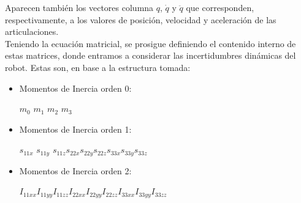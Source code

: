 Aparecen también los vectores columna $q$, $\dot{q}$ y $\ddot{q}$ que corresponden, respectivamente, a los valores de posición, velocidad y aceleración de las articulaciones.\\



Teniendo la ecuación matricial, se prosigue definiendo el contenido interno de estas matrices, donde entramos a considerar las incertidumbres dinámicas del robot. Estas son, en base a la estructura tomada:

\vspace{0.3cm}



\begin{itemize}
	
	\item Momentos de Inercia orden 0:
	
	\begin{center}
		
		$ m_0$ \hspace{0.2cm} $m_1$\hspace{0.2cm} $m_2$ \hspace{0.2cm}$m_3$
		
	\end{center}
	
	\item Momentos de Inercia orden 1:
	
	\begin{center}
		
		$ s_{11x}$\hspace{0.2cm} $s_{11y}$\hspace{0.2cm} $s_{11z}$\hspace{0.2cm}$ s_{22x}$\hspace{0.2cm}$ s_{22y}$\hspace{0.2cm}$ s_{22z}$\hspace{0.2cm}$ s_{33x}$\hspace{0.2cm}$ s_{33y}$\hspace{0.2cm}$ s_{33z} $
		
	\end{center}
	
	\item Momentos de Inercia orden 2:
	
	\begin{center}
		
		$ I_{11xx} $\hspace{0.2cm}$I_{11yy}$\hspace{0.2cm}$ I_{11zz}$\hspace{0.2cm}$ I_{22xx}$\hspace{0.2cm}$ I_{22yy}$\hspace{0.2cm}$ I_{22zz}$\hspace{0.2cm}$ I_{33xx}$\hspace{0.2cm}$ I_{33yy}$\hspace{0.2cm}$ I_{33zz} $
		

\end{center}
\end{itemize}
